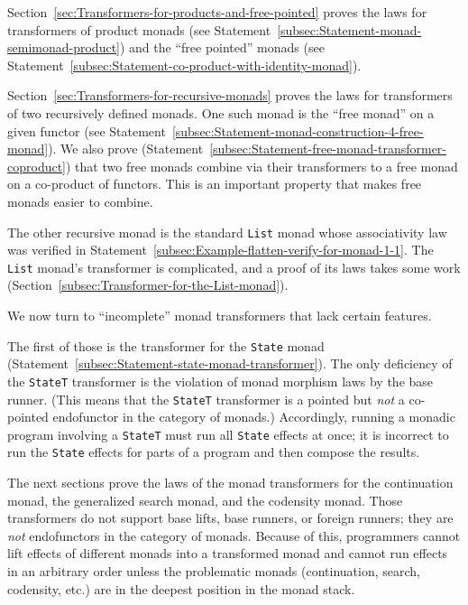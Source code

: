 Section~\ref{sec:Transformers-for-products-and-free-pointed} proves
the laws for transformers of product monads (see Statement~\ref{subsec:Statement-monad-semimonad-product})
and the \textsf{``}free pointed\textsf{''} monads (see Statement~\ref{subsec:Statement-co-product-with-identity-monad}). 

Section~\ref{sec:Transformers-for-recursive-monads} proves the laws
for transformers of two recursively defined monads. One such monad
is the \textsf{``}free monad\textsf{''} on a given functor (see Statement~\ref{subsec:Statement-monad-construction-4-free-monad}).
We also prove (Statement~\ref{subsec:Statement-free-monad-transformer-coproduct})
that two free monads combine via their transformers to a free monad
on a co-product of functors. This is an important property that makes
free monads easier to combine.

The other recursive monad is the standard \lstinline!List! monad
whose associativity law was verified in Statement~\ref{subsec:Example-flatten-verify-for-monad-1-1}.
The \lstinline!List! monad\textsf{'}s transformer is complicated, and a proof
of its laws takes some work (Section~\ref{subsec:Transformer-for-the-List-monad}).

We now turn to \textsf{``}incomplete\textsf{''} monad transformers that lack certain
features. 

The first of those is the transformer for the \lstinline!State! monad
(Statement~\ref{subsec:Statement-state-monad-transformer}). The
only deficiency of the \lstinline!StateT! transformer is the violation
of monad morphism laws by the base runner. (This means that the \lstinline!StateT!
transformer is a pointed but \emph{not} a co-pointed endofunctor in
the category of monads.) Accordingly, running a monadic program involving
a \lstinline!StateT! must run all \lstinline!State! effects at once;
it is incorrect to run the \lstinline!State! effects for parts of
a program and then compose the results.

The next sections prove the laws of the monad transformers for the
continuation monad, the generalized search monad, and the codensity
monad. Those transformers do not support base lifts, base runners,
or foreign runners; they are \emph{not} endofunctors in the category
of monads. Because of this, programmers cannot lift effects of different
monads into a transformed monad and cannot run effects in an arbitrary
order unless the problematic monads (continuation, search, codensity,
etc.) are in the deepest position in the monad stack.

